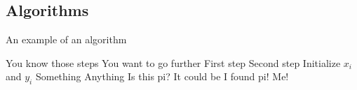 \subsection{Algorithms}

\begin{algorithm}

    \caption{An example of an algorithm}
    \label{alg:algorithm-example}
    
    \begin{algorithmic}
        \Require You know those steps
        \Require You want to go further
        \State First step
        \State Second step
        \State Initialize $x_i$ and $y_i$
            \State Something
            \State Anything
                \State Is this pi?
                \State It could be
            \EndIf
                \State I found pi!
            \EndFor
        \EndWhile
            \State Me!
    \end{algorithmic}
\end{algorithm}




